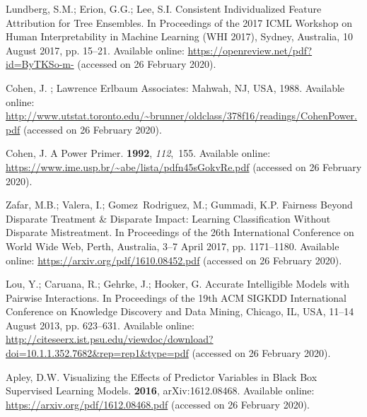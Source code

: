 \documentclass[information,article,accept,moreauthors,pdftex]{Definitions/mdpi}
\begin{document}
\begin{thebibliography}{999}
Lundberg, S.M.; Erion, G.G.; Lee, S.I.
\newblock Consistent {I}ndividualized {F}eature {A}ttribution for {T}ree
  {E}nsembles. In Proceedings of the 2017 ICML Workshop on Human
  Interpretability in Machine Learning (WHI 2017), Sydney, Australia, 10 August 2017, pp. 15--21. 
\newblock Available online: \url{https://openreview.net/pdf?id=ByTKSo-m-} (accessed on 26 February 2020).

Cohen, J.
; Lawrence Erlbaum Associates: Mahwah, NJ, USA, 1988. 
\newblock Available online: 
  \url{http://www.utstat.toronto.edu/~brunner/oldclass/378f16/readings/CohenPower.pdf}  (accessed on 26 February 2020).

Cohen, J.
\newblock A {P}ower {P}rimer.
 {\bf 1992}, {\em 112},~155.
\newblock Available online: \url{https://www.ime.usp.br/~abe/lista/pdfn45sGokvRe.pdf} (accessed on 26 February 2020).

Zafar, M.B.; Valera, I.; Gomez~Rodriguez, M.; Gummadi, K.P.
\newblock Fairness {B}eyond {D}isparate {T}reatment \& {D}isparate {I}mpact:
  {L}earning {C}lassification {W}ithout {D}isparate {M}istreatment.
\newblock  In Proceedings of the  26th International Conference on World Wide Web, Perth, Australia, 3--7 April  2017, pp.
  1171--1180. 
\newblock Available online: \url{https://arxiv.org/pdf/1610.08452.pdf} (accessed on 26 February 2020).

Lou, Y.; Caruana, R.; Gehrke, J.; Hooker, G.
\newblock Accurate {I}ntelligible {M}odels with {P}airwise {I}nteractions.
\newblock In Proceedings of the  19th ACM SIGKDD International Conference on
  Knowledge Discovery and Data Mining,  Chicago, IL, USA, 11--14 August 2013, pp. 623--631. 
\newblock Available online: 
  \url{http://citeseerx.ist.psu.edu/viewdoc/download?doi=10.1.1.352.7682&rep=rep1&type=pdf} (accessed on 26 February 2020).

Apley, D.W.
\newblock Visualizing the {E}ffects of {P}redictor {V}ariables in {B}lack {B}ox
  {S}upervised {L}earning {M}odels.
 {\bf 2016}, arXiv:1612.08468.
\newblock Available online: \url{https://arxiv.org/pdf/1612.08468.pdf} (accessed on 26 February 2020).


\end{thebibliography}
\end{document}
